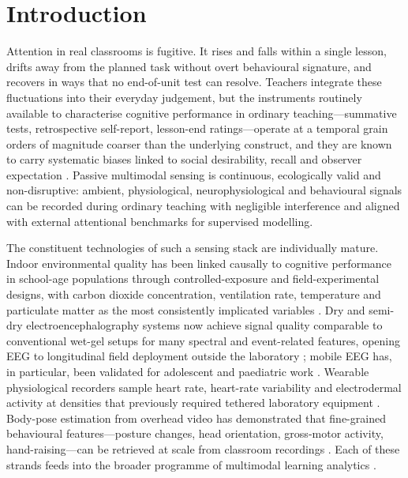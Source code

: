 \section{Introduction}\label{sec:introduction}

Attention in real classrooms is fugitive. It rises and falls within a single lesson, drifts away from the planned task without overt behavioural signature, and recovers in ways that no end-of-unit test can resolve. Teachers integrate these fluctuations into their everyday judgement, but the instruments routinely available to characterise cognitive performance in ordinary teaching---summative tests, retrospective self-report, lesson-end ratings---operate at a temporal grain orders of magnitude coarser than the underlying construct, and they are known to carry systematic biases linked to social desirability, recall and observer expectation \parencite{Fredricks2004_school,DMello2012_dynamics,Hutt2019_mind_wandering}. Passive multimodal sensing is continuous, ecologically valid and non-disruptive: ambient, physiological, neurophysiological and behavioural signals can be recorded during ordinary teaching with negligible interference and aligned with external attentional benchmarks for supervised modelling.

The constituent technologies of such a sensing stack are individually mature. Indoor environmental quality has been linked causally to cognitive performance in school-age populations through controlled-exposure and field-experimental designs, with carbon dioxide concentration, ventilation rate, temperature and particulate matter as the most consistently implicated variables \parencite{Wargocki2007_effects,Wargocki2020_classroom_co2,Bako2012_classroom,Satish2012_co2,Petersen2016_classroom,Allen2016_cogfx}. Dry and semi-dry electroencephalography systems now achieve signal quality comparable to conventional wet-gel setups for many spectral and event-related features, opening EEG to longitudinal field deployment outside the laboratory \parencite{LopezGordo2014_dry_eeg,DiFlumeri2019_dry_eeg_validation,Hinrichs2020_motion_artifacts}; mobile EEG has, in particular, been validated for adolescent and paediatric work \parencite{LauZhu2019_mobile_eeg_review}. Wearable physiological recorders sample heart rate, heart-rate variability and electrodermal activity at densities that previously required tethered laboratory equipment \parencite{SanchezReolid2024_eeg_fnirs}. Body-pose estimation from overhead video has demonstrated that fine-grained behavioural features---posture changes, head orientation, gross-motor activity, hand-raising---can be retrieved at scale from classroom recordings \parencite{Cao2021_openpose,Ahuja2019_edusense}. Each of these strands feeds into the broader programme of multimodal learning analytics \parencite{Blikstein2016_multimodal,Schneider2015_unraveling,Prinsloo2023_mmla_privacy,HernandezMustieles2024_wearable_education}.

